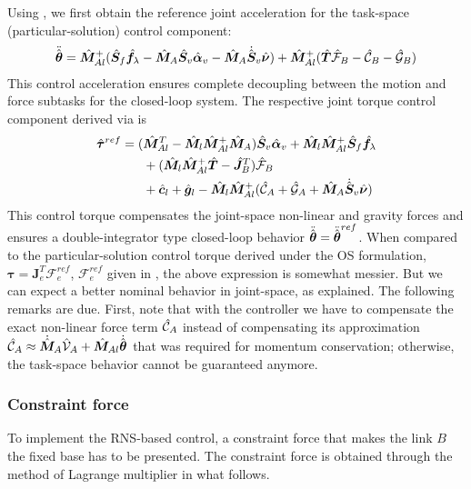 Using , we first obtain the reference joint
acceleration for the task-space (particular-solution) control component:
%
\begin{align}
  {\ddot{\hat{\bm{\theta}}}} = {\hat{\bm{M}}}_{Al}^{+}({\hat{\bm{S}}}_{f}{\hat{\bm{f}}}_{\lambda} - {\hat{\bm{M}}}_{A}{\hat{\bm{S}}}_{v}{\hat{\bm{\alpha}}}_{v} - {\hat{\bm{M}}}_{A}\dot{{\hat{\bm{S}}}}_{v}{\hat{\bm{\nu}}})
  + {\hat{\bm{M}}}_{Al}^{+}({\hat{\bm{T}}}\hat{\mathcal{F}}_{B} - \hat{\mathcal{C}}_{B} - \hat{\mathcal{G}}_{B})\label{eq:THDD_REF_RNS}
\end{align}
%
This control acceleration ensures complete decoupling between the motion and force subtasks for the closed-loop system.
The respective joint torque control component derived via  is
%
\begin{align}
  {\hat{\bm{\tau}}}^{ref} =  (&{\hat{\bm{M}}}_{Al}^{T} - {\hat{\bm{M}}}_{l}{\hat{\bm{M}}}_{Al}^{+}{\hat{\bm{M}}}_{A}){\hat{\bm{S}}}_{v}{\hat{\bm{\alpha}}}_{v} +
  {\hat{\bm{M}}}_{l}{\hat{\bm{M}}}_{Al}^{+}{\hat{\bm{S}}}_{f}{\hat{\bm{f}}}_{\lambda}\notag\\
  &+ ({\hat{\bm{M}}}_{l}{\hat{\bm{M}}}_{Al}^{+}{\hat{\bm{T}}} - {\hat{\bm{J}}}_{B}^{T})\hat{\mathcal{F}}_{B}\notag\\
  &+ {\hat{\bm{c}}}_{l} + {\hat{\bm{g}}}_{l} - {\hat{\bm{M}}}_{l}{\hat{\bm{M}}}_{Al}^{+}(\hat{\mathcal{C}}_{A} + \hat{\mathcal{G}}_{A} + {\hat{\bm{M}}}_{A}\dot{{\hat{\bm{S}}}}_{v}{\hat{\bm{\nu}}})\label{eq:TAU_REF_RNS}
\end{align}
%
This control torque compensates the joint-space non-linear and gravity forces and ensures a double-integrator type
closed-loop behavior ${\ddot{\hat{\bm{\theta}}}} = {\ddot{\hat{\bm{\theta}}}}^{ref}$.
When compared to the particular-solution control torque derived under the OS formulation,
$\bm{\tau} = \bm{J}_{e}^{T}\mathcal{F}_{e}^{ref}$,
$\mathcal{F}_{e}^{ref}$ given in ,
the above expression is somewhat messier.
But we can expect a better nominal behavior in joint-space, as explained.
The following remarks are due.
First, note that with the controller we have to compensate the exact non-linear force term $\hat{\mathcal{C}}_{A}$ instead of
compensating its approximation $\hat{\mathcal{C}}_{A} \approx \dot{{\hat{\bm{M}}}}_{A}\hat{\mathcal{V}}_{A} + {\hat{\bm{M}}}_{Al}{\dot{\hat{\bm{\theta}}}}$
that was required for momentum conservation;
otherwise, the task-space behavior cannot be guaranteed anymore.


\subsubsection{Constraint force}
To implement the RNS-based control,
a constraint force that makes the link $B$ the fixed base has to be presented.
The constraint force is obtained through the method of Lagrange multiplier in what follows.

